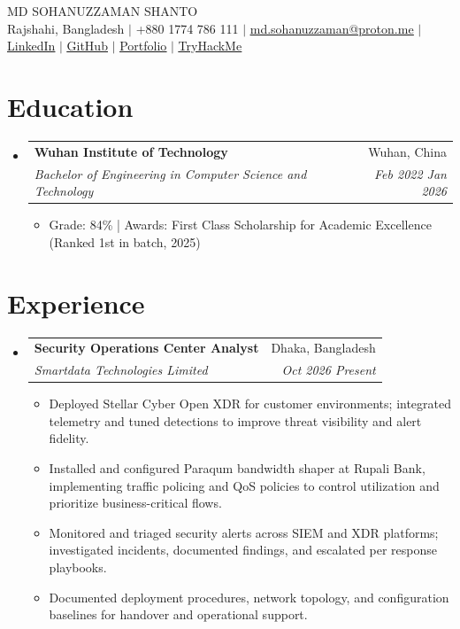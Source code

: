 \documentclass[letterpaper,11pt]{article}
\makeatletter
\newcommand{\resumeItem}[1]{
  \item\small{#1}
}
\newcommand{\resumeSubheading}[4]{
  \vspace{-2pt}\item
    \begin{tabular*}{0.97\textwidth}[t]{l@{\extracolsep{\fill}}r}
      \textbf{#1} & #2 \\
      \textit{\small#3} & \textit{\small #4} \\
    \end{tabular*}\vspace{-7pt}
}
\newcommand{\resumeSubHeadingListStart}{\begin{itemize}[leftmargin=0.15in, label={}]}
\newcommand{\resumeSubHeadingListEnd}{\end{itemize}}
\newcommand{\resumeItemListStart}{\begin{itemize}}
\newcommand{\resumeItemListEnd}{\end{itemize}\vspace{-5pt}}
\makeatother
\begin{document}

\begin{center}
    {\Huge \textsc{MD SOHANUZZAMAN SHANTO}} \\
    \vspace{6pt}
    {\small Rajshahi, Bangladesh $|$ +880 1774 786 111 $|$ \href{mailto:md.sohanuzzaman@proton.me}{\underline{md.sohanuzzaman@proton.me}} $|$ \href{https://linkedin.com/in/sohanuzzaman3301}{\underline{LinkedIn}} $|$ \href{https://github.com/sohanuzzaman3301}{\underline{GitHub}} $|$ \href{https://sohanuzzaman3301.github.io}{\underline{Portfolio}} $|$ \href{https://tryhackme.com/p/HiddenV1rus}{\underline{TryHackMe}}}
\end{center}
\section{Education}
\resumeSubHeadingListStart%
\resumeSubheading%
{Wuhan Institute of Technology}{Wuhan, China}
{Bachelor of Engineering in Computer Science and Technology}{Feb 2022 \- Jan 2026}
\resumeItemListStart%
\resumeItem{Grade: 84\% | Awards: First Class Scholarship for Academic Excellence (Ranked 1st in batch, 2025)}
\resumeItemListEnd%
\resumeSubHeadingListEnd%
%
\section{Experience}
\resumeSubHeadingListStart%
\resumeSubheading%
{Security Operations Center Analyst}{Dhaka, Bangladesh}
{Smartdata Technologies Limited}{Oct 2026 \- Present}
\resumeItemListStart%
\resumeItem{Deployed Stellar Cyber Open XDR for customer environments; integrated telemetry and tuned detections to improve threat visibility and alert fidelity.}
\resumeItem{Installed and configured Paraqum bandwidth shaper at Rupali Bank, implementing traffic policing and QoS policies to control utilization and prioritize business-critical flows.}
\resumeItem{Monitored and triaged security alerts across SIEM and XDR platforms; investigated incidents, documented findings, and escalated per response playbooks.}
\resumeItem{Documented deployment procedures, network topology, and configuration baselines for handover and operational support.}
\resumeItemListEnd%
\resumeSubHeadingListEnd%
%
\end{document}
